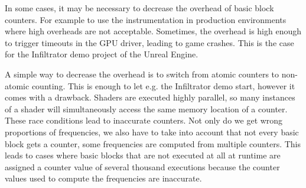 \begin{figure}
\centering
\pgfplotsset{width=0.75\textwidth}
\centering
{}
\label{dia:overhead}
\end{figure}

\begin{figure}
\centering
{}
\label{tab:overhead}
\end{figure}


In some cases, it may be necessary to decrease the overhead of basic block counters. For example to use the instrumentation in production environments where high overheads are not acceptable.
Sometimes, the overhead is high enough to trigger timeouts in the GPU driver, leading to game crashes. This is the case for the Infiltrator demo project of the Unreal Engine.

A simple way to decrease the overhead is to switch from atomic counters to non-atomic counting. This is enough to let e.g. the Infiltrator demo start, however it comes with a drawback. Shaders are executed highly parallel, so many instances of a shader will simultaneously access the same memory location of a counter.
These race conditions lead to inaccurate counters. Not only do we get wrong proportions of frequencies, we also have to take into account that not every basic block gets a counter, some frequencies are computed from multiple counters. This leads to cases where basic blocks that are not executed at all at runtime are assigned a counter value of several thousand executions because the counter values used to compute the frequencies are inaccurate.


